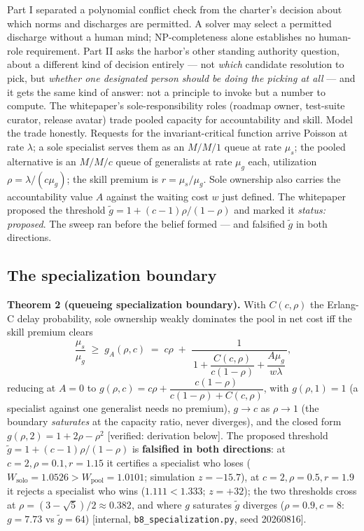 \documentclass[11pt,a4paper]{article}
\begin{document}
Part I separated a polynomial conflict check from the charter's decision about which norms and discharges are permitted.
A solver may select a permitted discharge without a human mind; NP-completeness alone establishes no human-role requirement. Part II asks the harbor's other standing authority
question, about a different kind of decision entirely --- not \emph{which} candidate resolution to pick, but \emph{whether one
designated person should be doing the picking at all} --- and it gets the same kind of answer: not a principle to invoke but a
number to compute. The whitepaper's sole-responsibility roles (roadmap owner, test-suite curator, release avatar) trade pooled
capacity for accountability and skill. Model the trade honestly. Requests for the invariant-critical function arrive Poisson at rate
$\lambda$; a sole specialist serves them as an $M/M/1$ queue at rate $\mu_s$; the pooled alternative is an $M/M/c$ queue of
generalists at rate $\mu_g$ each, utilization $\rho=\lambda/(c\mu_g)$; the skill premium is $r=\mu_s/\mu_g$. Sole ownership also
carries the accountability value $A$ against the waiting cost $w$ just defined. The whitepaper proposed the threshold $\tilde g = 1+(c-1)\rho/(1-\rho)$ and marked it \emph{status:
proposed}. The sweep ran before the belief formed --- and falsified $\tilde g$ in both directions.

\subsection*{The specialization boundary}
\begin{thebox}
\textbf{Theorem 2 (queueing specialization boundary).} With $C(c,\rho)$ the Erlang-C delay probability, sole ownership weakly
dominates the pool in net cost iff the skill premium clears
\[ \frac{\mu_s}{\mu_g} \;\ge\; g_A(\rho,c) \;=\; c\rho \;+\;
\frac{1}{\,1 + \dfrac{C(c,\rho)}{c(1-\rho)} + \dfrac{A\mu_g}{w\lambda}\,}, \]
reducing at $A=0$ to $g(\rho,c) = c\rho + \dfrac{c(1-\rho)}{c(1-\rho)+C(c,\rho)}$, with $g(\rho,1)=1$ (a specialist against one
generalist needs no premium), $g\to c$ as $\rho\to 1$ (the boundary \emph{saturates} at the capacity ratio, never diverges), and
the closed form $g(\rho,2)=1+2\rho-\rho^2$ [verified: derivation below]. The proposed threshold
$\tilde g = 1+(c-1)\rho/(1-\rho)$ is \textbf{falsified in both directions}: at $c{=}2,\rho{=}0.1,r{=}1.15$ it certifies a
specialist who loses ($W_{\mathrm{solo}}=1.0526 > W_{\mathrm{pool}}=1.0101$; simulation $z=-15.7$), at
$c{=}2,\rho{=}0.5,r{=}1.9$ it rejects a specialist who wins ($1.111 < 1.333$; $z=+32$); the two thresholds cross at
$\rho=(3-\sqrt5)/2\approx0.382$, and where $g$ saturates $\tilde g$ diverges ($\rho{=}0.9, c{=}8$: $g=7.73$ vs $\tilde g=64$)
[internal, \texttt{b8\_specialization.py}, seed 20260816].
\end{thebox}
\end{document}
